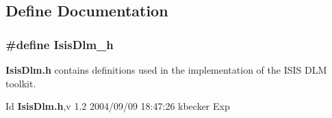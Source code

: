 \subsection{Define Documentation}
\subsubsection{\setlength{\rightskip}{0pt plus 5cm}\#define Isis\-Dlm\_\-h}\label{IsisDlm_8h_a0}


{\bf Isis\-Dlm.h} contains definitions used in the implementation of the ISIS DLM toolkit.

\begin{Desc}
\item[Id]{\bf Isis\-Dlm.h},v 1.2 2004/09/09 18:47:26 kbecker Exp \end{Desc}
